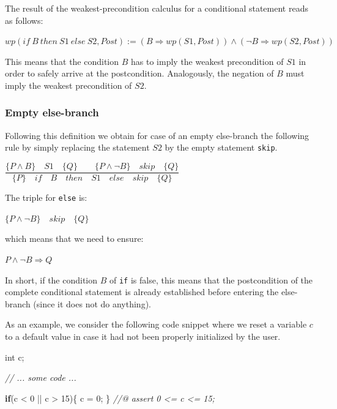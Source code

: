 \documentclass[12pt,francais,]{scrbook}
\newenvironment{Shaded}{}{}
\newcommand{\KeywordTok}[1]{\textcolor[rgb]{0.00,0.44,0.13}{\textbf{{#1}}}}
\newcommand{\DataTypeTok}[1]{\textcolor[rgb]{0.56,0.13,0.00}{{#1}}}
\newcommand{\DecValTok}[1]{\textcolor[rgb]{0.25,0.63,0.44}{{#1}}}
\newcommand{\CommentTok}[1]{\textcolor[rgb]{0.38,0.63,0.69}{\textit{{#1}}}}
\newcommand{\NormalTok}[1]{{#1}}
\begin{document}
The result of the weakest-precondition calculus for a conditional
statement reads as follows:

\begin{center}
\(wp(if\ B\ then\ S1\ else\ S2 , Post) := (B \Rightarrow wp(S1, Post)) \wedge (\neg B \Rightarrow wp(S2, Post))\)
\end{center}

This means that the condition \(B\) has to imply the weakest
precondition of \(S1\) in order to safely arrive at the postcondition.
Analogously, the negation of \(B\) must imply the weakest precondition
of \(S2\).

\subsubsection{Empty else-branch}\label{empty-else-branch}

Following this definition we obtain for case of an empty else-branch the
following rule by simply replacing the statement \(S2\) by the empty
statement \texttt{skip}.

\begin{center}
\(\dfrac{\{P \wedge B\}\quad S1\quad \{Q\} \quad \quad \{P \wedge \neg B\}\quad skip\quad \{Q\}}{\{P\}\quad if\quad B\quad then\quad S1\quad else\quad skip \quad \{Q\}}\)
\end{center}

The triple for \texttt{else} is:

\begin{center} \(\{P \wedge \neg B\}\quad skip\quad \{Q\}\)
\end{center}

which means that we need to ensure:

\begin{center} \(P \wedge \neg B \Rightarrow Q\) \end{center}

In short, if the condition \(B\) of \texttt{if} is false, this means
that the postcondition of the complete conditional statement is already
established before entering the else-branch (since it does not do
anything).

As an example, we consider the following code snippet where we reset a
variable \(c\) to a default value in case it had not been properly
initialized by the user.

\begin{footnotesize}\begin{Shaded}
\begin{Highlighting}[]
\DataTypeTok{int} \NormalTok{c;}

\CommentTok{// ... some code ...}

\KeywordTok{if}\NormalTok{(c < }\DecValTok{0} \NormalTok{|| c > }\DecValTok{15}\NormalTok{)\{}
  \NormalTok{c = }\DecValTok{0}\NormalTok{;}
\NormalTok{\}}
\CommentTok{//@ assert 0 <= c <= 15;}
\end{Highlighting}
\end{Shaded}\end{footnotesize}
\end{document}
